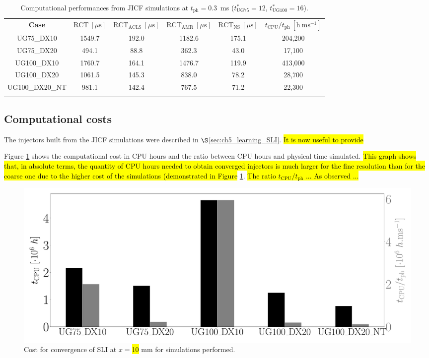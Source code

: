 \begin{table}[!h]
\centering
\caption{Computational performances from JICF simulations at $t_\mathrm{ph} = 0.3$~ms ($t^*_{\mathrm{UG}75} = 12$, $t^*_{\mathrm{UG}100} = 16$).}
\begin{tabular}{cccccc}
\thickhline
\textbf{Case} &  $\mathrm{RCT}~[\mu \mathrm{s}]$ & $\mathrm{RCT}_\mathrm{ACLS}~[\mu \mathrm{s}]$ & $\mathrm{RCT}_\mathrm{AMR}~[\mu \mathrm{s}]$ & $\mathrm{RCT}_\mathrm{NS}~[\mu \mathrm{s}]$ & $t_\mathrm{CPU} / t_\mathrm{ph}  ~ [\mathrm{h}~\mathrm{ms^{-1}}]$\\
\thickhline 
UG75\_DX10 & 1549.7 & 192.0 & 1182.6 & 175.1 & 204,200 \\
UG75\_DX20 & 494.1 & 88.8 & 362.3 & 43.0 & 17,100  \\
UG100\_DX10 & 1760.7 & 164.1 & 1476.7 & 119.9 & 413,000 \\
UG100\_DX20 & 1061.5 & 145.3 & 838.0 & 78.2 & 28,700  \\
UG100\_DX20\_NT & 981.1 & 142.4 & 767.5 & 71.2 & 22,300 \\
\thickhline
\end{tabular}
\label{tab:jicf_computational_performances}
\end{table}


\subsection{Computational costs}

The injectors built from the JICF simulations were described in $\S$\ref{sec:ch5_learning_SLI}. \hl{It is now useful to provide }

Figure \ref{fig:SLI_cost_convergence_all} shows the computational cost in CPU hours and the ratio between CPU hours and physical time simulated. \hl{This graph shows that, in absolute terms, the quantity of CPU hours needed to obtain converged injectors is much larger for the fine resolution than for the coarse one due to the higher cost of the simulations (demonstrated in Figure} \ref{tab:jicf_computational_performances}. \hl{The ratio $t_\mathrm{CPU}/t_\mathrm{ph}$ ... As observed ...}

\begin{figure}[ht]
	\centering
   \includegraphics[scale=0.225]{./part2_developments/figures_ch5_resolved_JICF/SLI_cost_for_convergence/cost_all_simulations}
   \caption{Cost for convergence of SLI at $x = $\hl{10} mm for simulations performed.}
   \label{fig:SLI_cost_convergence_all}
\end{figure}

